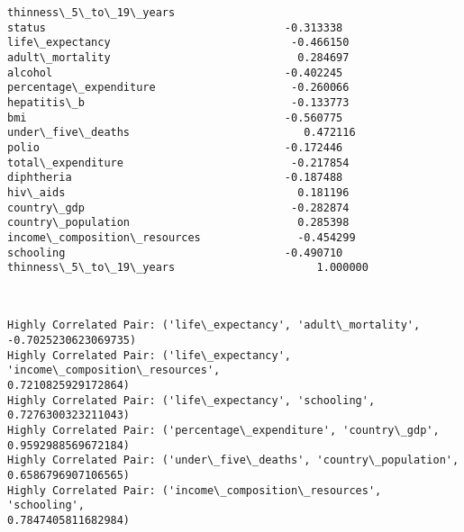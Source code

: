 \documentclass[11pt]{article}
\begin{document}
\begin{Verbatim}[commandchars=\\\{\}]
                              thinness\_5\_to\_19\_years
status                                     -0.313338
life\_expectancy                            -0.466150
adult\_mortality                             0.284697
alcohol                                    -0.402245
percentage\_expenditure                     -0.260066
hepatitis\_b                                -0.133773
bmi                                        -0.560775
under\_five\_deaths                           0.472116
polio                                      -0.172446
total\_expenditure                          -0.217854
diphtheria                                 -0.187488
hiv\_aids                                    0.181196
country\_gdp                                -0.282874
country\_population                          0.285398
income\_composition\_resources               -0.454299
schooling                                  -0.490710
thinness\_5\_to\_19\_years                      1.000000
    \end{Verbatim}

    \begin{center}
    \end{center}
    { \hspace*{\fill} \\}
    
    \begin{Verbatim}[commandchars=\\\{\}]
Highly Correlated Pair: ('life\_expectancy', 'adult\_mortality',
-0.7025230623069735)
Highly Correlated Pair: ('life\_expectancy', 'income\_composition\_resources',
0.7210825929172864)
Highly Correlated Pair: ('life\_expectancy', 'schooling', 0.7276300323211043)
Highly Correlated Pair: ('percentage\_expenditure', 'country\_gdp',
0.9592988569672184)
Highly Correlated Pair: ('under\_five\_deaths', 'country\_population',
0.6586796907106565)
Highly Correlated Pair: ('income\_composition\_resources', 'schooling',
0.7847405811682984)
    \end{Verbatim}

    \begin{center}
    \end{center}
    { \hspace*{\fill} \\}
    
    \begin{center}
    \end{center}
    { \hspace*{\fill} \\}
    
\end{document}
